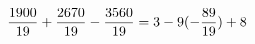 \documentclass[preview]{standalone}
\begin{document}
\begin{align*}
\special{dvisvgm:raw <g id='unique000'>}\frac{1900}{19} + \frac{2670}{19} - \frac{3560}{19} = 3 - 9 (- \frac{89}{19}) + 8\special{dvisvgm:raw </g>}
\end{align*}
\end{document}
